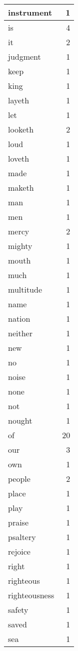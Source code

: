 \begin{center}
\begin{longtable}{l|r}
instrument & 1 \\ \hline
is & 4 \\ \hline
it & 2 \\ \hline
judgment & 1 \\ \hline
keep & 1 \\ \hline
king & 1 \\ \hline
layeth & 1 \\ \hline
let & 1 \\ \hline
looketh & 2 \\ \hline
loud & 1 \\ \hline
loveth & 1 \\ \hline
made & 1 \\ \hline
maketh & 1 \\ \hline
man & 1 \\ \hline
men & 1 \\ \hline
mercy & 2 \\ \hline
mighty & 1 \\ \hline
mouth & 1 \\ \hline
much & 1 \\ \hline
multitude & 1 \\ \hline
name & 1 \\ \hline
nation & 1 \\ \hline
neither & 1 \\ \hline
new & 1 \\ \hline
no & 1 \\ \hline
noise & 1 \\ \hline
none & 1 \\ \hline
not & 1 \\ \hline
nought & 1 \\ \hline
of & 20 \\ \hline
our & 3 \\ \hline
own & 1 \\ \hline
people & 2 \\ \hline
place & 1 \\ \hline
play & 1 \\ \hline
praise & 1 \\ \hline
psaltery & 1 \\ \hline
rejoice & 1 \\ \hline
right & 1 \\ \hline
righteous & 1 \\ \hline
righteousness & 1 \\ \hline
safety & 1 \\ \hline
saved & 1 \\ \hline
sea & 1 \\ \hline

\end{longtable}
\end{center}
